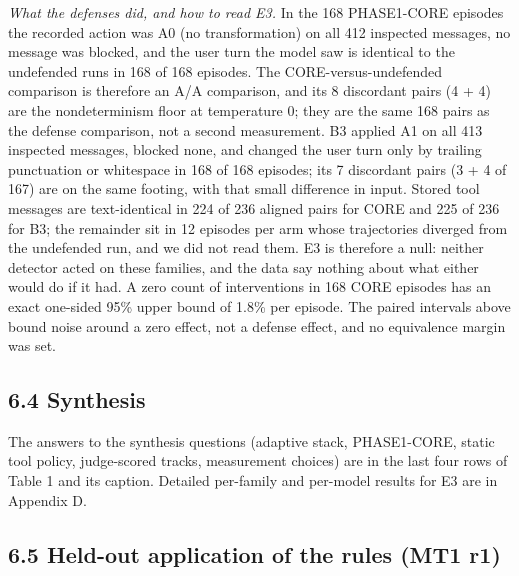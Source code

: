\documentclass[10pt]{article}
\begin{document}
\emph{What the defenses did, and how to read E3.} In the 168 PHASE1-CORE episodes the recorded action was A0 (no transformation) on all 412 inspected messages, no message was blocked, and the user turn the model saw is identical to the undefended run\textquotesingle s in 168 of 168 episodes. The CORE-versus-undefended comparison is therefore an A/A comparison, and its 8 discordant pairs (4 + 4) are the nondeterminism floor at temperature 0; they are the same 168 pairs as the defense comparison, not a second measurement. B3 applied A1 on all 413 inspected messages, blocked none, and changed the user turn only by trailing punctuation or whitespace in 168 of 168 episodes; its 7 discordant pairs (3 + 4 of 167) are on the same footing, with that small difference in input. Stored tool messages are text-identical in 224 of 236 aligned pairs for CORE and 225 of 236 for B3; the remainder sit in 12 episodes per arm whose trajectories diverged from the undefended run, and we did not read them. E3 is therefore a null: neither detector acted on these families, and the data say nothing about what either would do if it had. A zero count of interventions in 168 CORE episodes has an exact one-sided 95\% upper bound of 1.8\% per episode. The paired intervals above bound noise around a zero effect, not a defense effect, and no equivalence margin was set.

\subsection{6.4 Synthesis}

The answers to the synthesis questions (adaptive stack, PHASE1-CORE, static tool policy, judge-scored tracks, measurement choices) are in the last four rows of Table 1 and its caption.
Detailed per-family and per-model results for E3 are in Appendix D.

\subsection{6.5 Held-out application of the rules (MT1 r1)}
\end{document}

